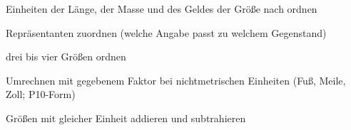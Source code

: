 \begin{aufgabe}{Einheiten der Länge, der Masse und des Geldes der Größe nach ordnen}
\end{aufgabe}

\begin{aufgabe}{Repräsentanten zuordnen (welche Angabe passt zu welchem Gegenstand)}
\end{aufgabe}

\begin{aufgabe}{drei bis vier Größen ordnen}
\end{aufgabe}

\begin{aufgabe}{Umrechnen mit gegebenem Faktor bei nichtmetrischen Einheiten (Fuß, Meile, Zoll; P10-Form)}
\end{aufgabe}

\begin{aufgabe}{Größen mit gleicher Einheit addieren und subtrahieren}
\end{aufgabe}

